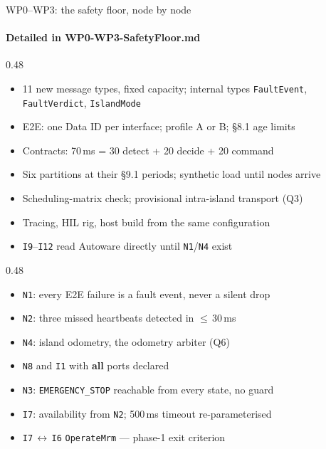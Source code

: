 \documentclass{ntuslides}          %
\begin{document}
\begin{frame}{WP0--WP3: the safety floor, node by node}
  \framesubtitle{Detailed in WP0-WP3-SafetyFloor.md}

  \begin{cols}
    \begin{col}{0.48}
      \begin{itemize}\footnotesize
        \item 11 new message types, fixed capacity; internal types \texttt{FaultEvent}, \texttt{FaultVerdict}, \texttt{IslandMode}
        \item E2E: one Data ID per interface; profile A or B; §8.1 age limits
        \item Contracts: 70\,ms = 30 detect + 20 decide + 20 command
      \end{itemize}
      \begin{itemize}\footnotesize
        \item Six partitions at their §9.1 periods; synthetic load until nodes arrive
        \item Scheduling-matrix check; provisional intra-island transport (Q3)
        \item Tracing, HIL rig, host build from the same configuration
        \item \texttt{I9}--\texttt{I12} read Autoware directly until \texttt{N1}/\texttt{N4} exist
      \end{itemize}
    \end{col}
    \begin{col}{0.48}
      \begin{itemize}\footnotesize
        \item \texttt{N1}: every E2E failure is a fault event, never a silent drop
        \item \texttt{N2}: three missed heartbeats detected in $\leq$\,30\,ms
        \item \texttt{N4}: island odometry, the odometry arbiter (Q6)
      \end{itemize}
      \begin{itemize}\footnotesize
        \item \texttt{N8} and \texttt{I1} with \textbf{all} ports declared
        \item \texttt{N3}: \texttt{EMERGENCY\_STOP} reachable from every state, no guard
        \item \texttt{I7}: availability from \texttt{N2}; 500\,ms timeout re-parameterised
        \item \texttt{I7}\,$\leftrightarrow$\,\texttt{I6} \texttt{OperateMrm} --- phase-1 exit criterion
      \end{itemize}
    \end{col}
  \end{cols}


\end{frame}
\end{document}
